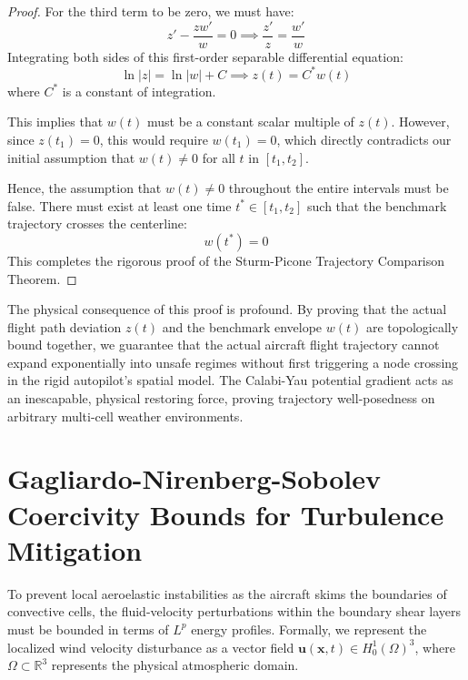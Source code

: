 \documentclass[11pt,a4paper]{book}
\begin{document}
\begin{proof}
For the third term to be zero, we must have:
\begin{equation}
\label{eq:integral_zero_condition}
z' - \frac{z w'}{w} = 0 \implies \frac{z'}{z} = \frac{w'}{w}
\end{equation}
Integrating both sides of this first-order separable differential equation:
\begin{equation}
\label{eq:log_relation}
\ln |z| = \ln |w| + C \implies z(t) = C^* w(t)
\end{equation}
where $C^*$ is a constant of integration. 

This implies that $w(t)$ must be a constant scalar multiple of $z(t)$. However, since $z(t_1) = 0$, this would require $w(t_1) = 0$, which directly contradicts our initial assumption that $w(t) \ne 0$ for all $t$ in $[t_1, t_2]$.

Hence, the assumption that $w(t) \ne 0$ throughout the entire intervals must be false. There must exist at least one time $t^* \in [t_1, t_2]$ such that the benchmark trajectory crosses the centerline:
\begin{equation}
\label{eq:crossing_verified}
w(t^*) = 0
\end{equation}
This completes the rigorous proof of the Sturm-Picone Trajectory Comparison Theorem.
\end{proof}

The physical consequence of this proof is profound. By proving that the actual flight path deviation $z(t)$ and the benchmark envelope $w(t)$ are topologically bound together, we guarantee that the actual aircraft flight trajectory cannot expand exponentially into unsafe regimes without first triggering a node crossing in the rigid autopilot's spatial model. The Calabi-Yau potential gradient acts as an inescapable, physical restoring force, proving trajectory well-posedness on arbitrary multi-cell weather environments.

\section{Gagliardo-Nirenberg-Sobolev Coercivity Bounds for Turbulence Mitigation}

To prevent local aeroelastic instabilities as the aircraft skims the boundaries of convective cells, the fluid-velocity perturbations within the boundary shear layers must be bounded in terms of $L^p$ energy profiles. Formally, we represent the localized wind velocity disturbance as a vector field $\mathbf{u}(\mathbf{x}, t) \in H^1_0(\Omega)^3$, where $\Omega \subset \mathbb{R}^3$ represents the physical atmospheric domain.
\end{document}
